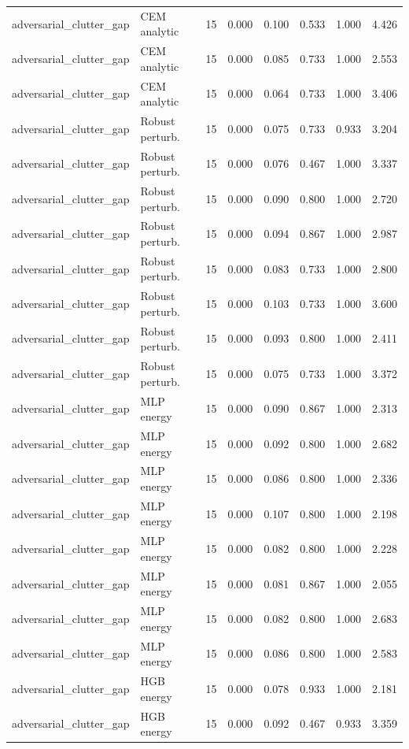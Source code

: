 {\begin{longtable}{llrrrrrr}
adversarial\_clutter\_gap & CEM analytic & 15 & 0.000 & 0.100 & 0.533 & 1.000 & 4.426 \\
adversarial\_clutter\_gap & CEM analytic & 15 & 0.000 & 0.085 & 0.733 & 1.000 & 2.553 \\
adversarial\_clutter\_gap & CEM analytic & 15 & 0.000 & 0.064 & 0.733 & 1.000 & 3.406 \\
adversarial\_clutter\_gap & Robust perturb. & 15 & 0.000 & 0.075 & 0.733 & 0.933 & 3.204 \\
adversarial\_clutter\_gap & Robust perturb. & 15 & 0.000 & 0.076 & 0.467 & 1.000 & 3.337 \\
adversarial\_clutter\_gap & Robust perturb. & 15 & 0.000 & 0.090 & 0.800 & 1.000 & 2.720 \\
adversarial\_clutter\_gap & Robust perturb. & 15 & 0.000 & 0.094 & 0.867 & 1.000 & 2.987 \\
adversarial\_clutter\_gap & Robust perturb. & 15 & 0.000 & 0.083 & 0.733 & 1.000 & 2.800 \\
adversarial\_clutter\_gap & Robust perturb. & 15 & 0.000 & 0.103 & 0.733 & 1.000 & 3.600 \\
adversarial\_clutter\_gap & Robust perturb. & 15 & 0.000 & 0.093 & 0.800 & 1.000 & 2.411 \\
adversarial\_clutter\_gap & Robust perturb. & 15 & 0.000 & 0.075 & 0.733 & 1.000 & 3.372 \\
adversarial\_clutter\_gap & MLP energy & 15 & 0.000 & 0.090 & 0.867 & 1.000 & 2.313 \\
adversarial\_clutter\_gap & MLP energy & 15 & 0.000 & 0.092 & 0.800 & 1.000 & 2.682 \\
adversarial\_clutter\_gap & MLP energy & 15 & 0.000 & 0.086 & 0.800 & 1.000 & 2.336 \\
adversarial\_clutter\_gap & MLP energy & 15 & 0.000 & 0.107 & 0.800 & 1.000 & 2.198 \\
adversarial\_clutter\_gap & MLP energy & 15 & 0.000 & 0.082 & 0.800 & 1.000 & 2.228 \\
adversarial\_clutter\_gap & MLP energy & 15 & 0.000 & 0.081 & 0.867 & 1.000 & 2.055 \\
adversarial\_clutter\_gap & MLP energy & 15 & 0.000 & 0.082 & 0.800 & 1.000 & 2.683 \\
adversarial\_clutter\_gap & MLP energy & 15 & 0.000 & 0.086 & 0.800 & 1.000 & 2.583 \\
adversarial\_clutter\_gap & HGB energy & 15 & 0.000 & 0.078 & 0.933 & 1.000 & 2.181 \\
adversarial\_clutter\_gap & HGB energy & 15 & 0.000 & 0.092 & 0.467 & 0.933 & 3.359 \\

\end{longtable}}
